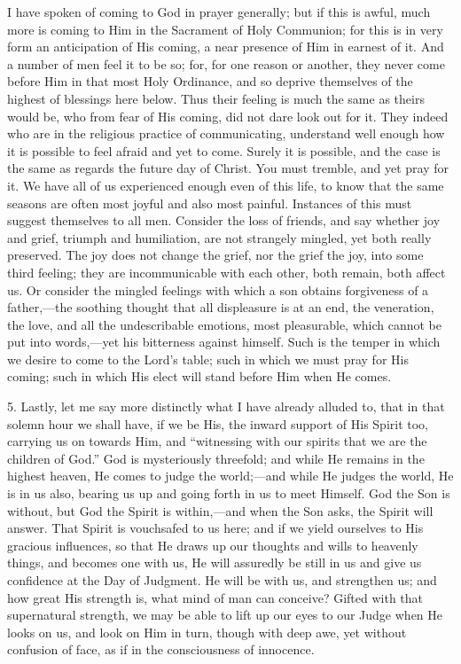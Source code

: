 I have spoken of coming to God in prayer generally; but if this is
awful, much more is coming to Him in the Sacrament of Holy Communion;
for this is in very form an anticipation of His coming, a near
presence of Him in earnest of it. And a number of men feel it to be
so; for, for one reason or another, they never come before Him in that
most Holy Ordinance, and so deprive themselves of the highest of
blessings here below. Thus their feeling is much the same as theirs
would be, who from fear of His coming, did not dare look out for it.
They indeed who are in the religious practice of communicating,
understand well enough how it is possible to feel afraid and yet to
come. Surely it is possible, and the case is the same as regards the
future day of Christ. You must tremble, and yet pray for it. We have
all of us experienced enough even of this life, to know that the same
seasons are often most joyful and also most painful. Instances of this
must suggest themselves to all men. Consider the loss of friends, and
say whether joy and grief, triumph and humiliation, are not strangely
mingled, yet both really preserved. The joy does not change the grief,
nor the grief the joy, into some third feeling; they are
incommunicable with each other, both remain, both affect us. Or
consider the mingled feelings with which a son obtains forgiveness of
a father,—the soothing thought that all displeasure is at an end,
the veneration, the love, and all the undescribable emotions, most
pleasurable, which cannot be put into words,—yet his bitterness
against himself. Such is the temper in which we desire to come to the
Lord's table; such in which we must pray for His coming; such in which
His elect will stand before Him when He comes.

5. Lastly, let me say more distinctly what I have already alluded
to, that in that solemn hour we shall have, if we be His, the inward
support of His Spirit too, carrying us on towards Him, and
``witnessing with our spirits that we are the children of
God.'' God is mysteriously threefold; and while He remains in the
highest heaven, He comes to judge the world;—and while He judges the
world, He is in us also, bearing us up and going forth in us to meet
Himself. God the Son is without, but God the Spirit is within,—and
when the Son asks, the Spirit will answer. That Spirit is vouchsafed
to us here; and if we yield ourselves to His gracious influences, so
that He draws up our thoughts and wills to heavenly things, and
becomes one with us, He will assuredly be still in us and give us
confidence at the Day of Judgment. He will be with us, and strengthen
us; and how great His strength is, what mind of man can conceive?
Gifted with that supernatural strength, we may be able to lift up our
eyes to our Judge when He looks on us, and look on Him in turn, though
with deep awe, yet without confusion of face, as if in the
consciousness of innocence.

